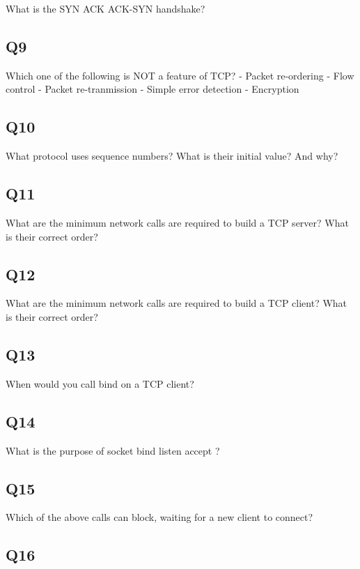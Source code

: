 What is the SYN ACK ACK-SYN handshake?

\subsection{Q9}\label{q9}

Which one of the following is NOT a feature of TCP? - Packet re-ordering
- Flow control - Packet re-tranmission - Simple error detection -
Encryption

\subsection{Q10}\label{q10}

What protocol uses sequence numbers? What is their initial value? And
why?

\subsection{Q11}\label{q11}

What are the minimum network calls are required to build a TCP server?
What is their correct order?

\subsection{Q12}\label{q12}

What are the minimum network calls are required to build a TCP client?
What is their correct order?

\subsection{Q13}\label{q13}

When would you call bind on a TCP client?

\subsection{Q14}\label{q14}

What is the purpose of socket bind listen accept ?

\subsection{Q15}\label{q15}

Which of the above calls can block, waiting for a new client to connect?

\subsection{Q16}\label{q16}

